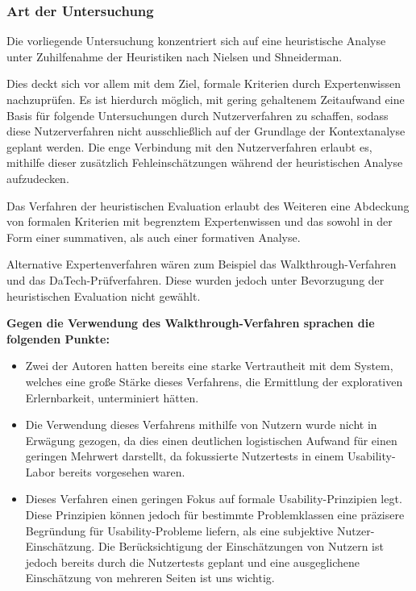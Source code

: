 \documentclass[
  12pt,
  ngerman,
  a4paper,
]{article}
\begin{document}
\hypertarget{art-der-untersuchung}{%
\subsubsection{Art der Untersuchung}\label{art-der-untersuchung}}

Die vorliegende Untersuchung konzentriert sich auf eine heuristische
Analyse unter Zuhilfenahme der Heuristiken nach Nielsen und Shneiderman.

Dies deckt sich vor allem mit dem Ziel, formale Kriterien durch
Expertenwissen nachzuprüfen. Es ist hierdurch möglich, mit gering
gehaltenem Zeitaufwand eine Basis für folgende Untersuchungen durch
Nutzerverfahren zu schaffen, sodass diese Nutzerverfahren nicht
ausschließlich auf der Grundlage der Kontextanalyse geplant werden. Die
enge Verbindung mit den Nutzerverfahren erlaubt es, mithilfe dieser
zusätzlich Fehleinschätzungen während der heuristischen Analyse
aufzudecken.

Das Verfahren der heuristischen Evaluation erlaubt des Weiteren eine
Abdeckung von formalen Kriterien mit begrenztem Expertenwissen und das
sowohl in der Form einer summativen, als auch einer formativen Analyse.

Alternative Expertenverfahren wären zum Beispiel das
Walkthrough-Verfahren und das DaTech-Prüfverfahren. Diese wurden jedoch
unter Bevorzugung der heuristischen Evaluation nicht gewählt.

\textbf{Gegen die Verwendung des Walkthrough-Verfahren sprachen die
folgenden Punkte:}

\begin{itemize}
\item
  Zwei der Autoren hatten bereits eine starke Vertrautheit mit dem
  System, welches eine große Stärke dieses Verfahrens, die Ermittlung
  der explorativen Erlernbarkeit, unterminiert hätten.
\item
  Die Verwendung dieses Verfahrens mithilfe von Nutzern wurde nicht in
  Erwägung gezogen, da dies einen deutlichen logistischen Aufwand für
  einen geringen Mehrwert darstellt, da fokussierte Nutzertests in einem
  Usability-Labor bereits vorgesehen waren.
\item
  Dieses Verfahren einen geringen Fokus auf formale Usability-Prinzipien
  legt. Diese Prinzipien können jedoch für bestimmte Problemklassen eine
  präzisere Begründung für Usability-Probleme liefern, als eine
  subjektive Nutzer-Einschätzung. Die Berücksichtigung der
  Einschätzungen von Nutzern ist jedoch bereits durch die Nutzertests
  geplant und eine ausgeglichene Einschätzung von mehreren Seiten ist
  uns wichtig.
\end{itemize}
\end{document}
